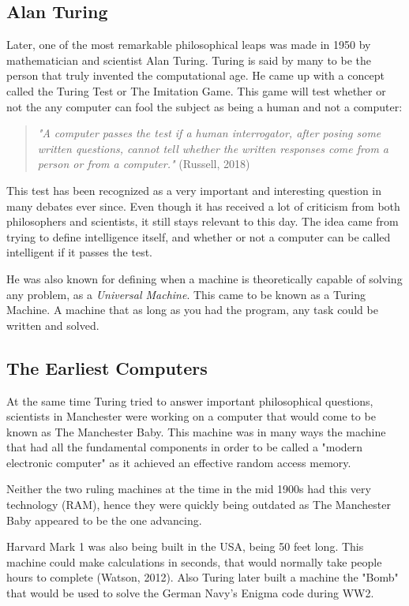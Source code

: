 \documentclass[
a4paper,
11pt,
english
]{report}
\begin{document}
\subsection{Alan Turing}
Later, one of the most remarkable philosophical leaps was made in 1950 by mathematician and scientist Alan Turing. Turing is said by many to be the person that truly invented the computational age. He came up with a concept called the Turing Test or The Imitation Game. This game will test whether or not the any computer can fool the subject as being a human and not a computer:

\begin{quote}
    \textit{"A computer passes the test if a human interrogator, after posing some written questions, cannot tell whether the written responses come from a person or from a computer."} (Russell, 2018)
\end{quote}

This test has been recognized as a very important and interesting question in many debates ever since. Even though it has received a lot of criticism from both philosophers and scientists, it still stays relevant to this day. The idea came from trying to define intelligence itself, and whether or not a computer can be called intelligent if it passes the test.

He was also known for defining when a machine is theoretically capable of solving any problem, as a \textit{Universal Machine}. This came to be known as a Turing Machine. A machine that as long as you had the program, any task could be written and solved.

\subsection{The Earliest Computers}
At the same time Turing tried to answer important philosophical questions, scientists in Manchester were working on a computer that would come to be known as The Manchester Baby. This machine was in many ways the machine that had all the fundamental components in order to be called a "modern electronic computer" as it achieved an effective random access memory.

Neither the two ruling machines at the time in the mid 1900s had this very technology (RAM), hence they were quickly being outdated as The Manchester Baby appeared to be the one advancing.

Harvard Mark 1 was also being built in the USA, being 50 feet long. This machine could make calculations in seconds, that would normally take people hours to complete (Watson, 2012). Also Turing later built a machine the "Bomb" that would be used to solve the German Navy's Enigma code during WW2.
\end{document}
